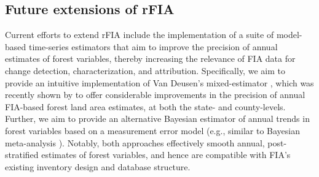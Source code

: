 \documentclass[11pt]{article}
\begin{document}
\subsection*{Future extensions of rFIA}
Current efforts to extend rFIA include the implementation of a suite of model-based time-series estimators that aim to improve the precision of annual estimates of forest variables, thereby increasing the relevance of FIA data for change detection, characterization, and attribution. Specifically, we aim to provide an intuitive implementation of Van Deusen's mixed-estimator \citep{van1999modeling}, which was recently shown by \citet{hou2021updating} to offer considerable improvements in the precision of annual FIA-based forest land area estimates, at both the state- and county-levels. Further, we aim to provide an alternative Bayesian estimator of annual trends in forest variables based on a measurement error model (e.g., similar to Bayesian meta-analysis \citep{sutton2001bayesian}). Notably, both approaches effectively smooth annual, post-stratified estimates of forest variables, and hence are compatible with FIA's existing inventory design and database structure. 



\clearpage

\printbibliography
\end{document}
